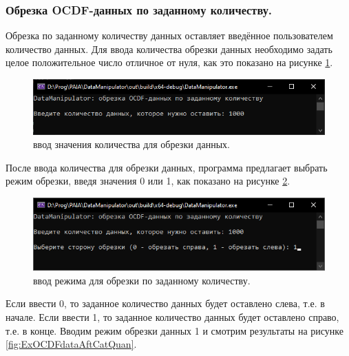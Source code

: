 \subsubsection{ \standartTitleFont
  Обрезка OCDF-данных по заданному количеству. 
} \label{subsubsec:OCDFCutQuan}

{\standartFont

  \par Обрезка по заданному количеству данных оставляет введённое пользователем количество данных. Для ввода количества обрезки данных необходимо задать целое положительное число отличное от нуля, как это показано на рисунке \ref{fig:OCDFcutquan1}. 

  \begin{figure}[H]
    \centering
    \includegraphics{images/forDataManipulator/OCDFcutquantitystage1.png}
    \caption{ввод значения количества для обрезки данных.} 
    \label{fig:OCDFcutquan1}
  \end{figure}

  \par После ввода количества для обрезки данных, программа предлагает выбрать режим обрезки, введя значения 0 или 1, как показано на рисунке \ref{fig:OCDFcutquan2}. 

  \begin{figure}[H]
    \centering
    \includegraphics{images/forDataManipulator/OCDFcutquantitystage2.png}
    \caption{ввод режима для обрезки по заданному количеству.} 
    \label{fig:OCDFcutquan2}
  \end{figure}

  \par Если ввести 0, то заданное количество данных будет оставлено слева, т.е. в начале. Если ввести 1, то заданное количество данных будет оставлено справо, т.е. в конце. Вводим режим обрезки данных 1 и смотрим результаты на рисунке \ref{fig:ExOCDFdataAftCatQuan}. 

}
